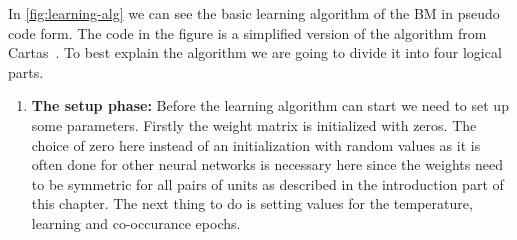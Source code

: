 \documentclass[12pt,twoside]{article}
\theoremstyle{plain}
\theoremstyle{definition}
\theoremstyle{remark}
\begin{document}
In \cref{fig:learning-alg} we can see the basic learning algorithm of the BM in pseudo code form.
The code in the figure is a simplified version of the algorithm from Cartas~\cite{BMImpl}.
To best explain the algorithm we are going to divide it into four logical parts.
\begin{enumerate}
    \item \textbf{The setup phase:}\newline
        Before the learning algorithm can start we need to set up some parameters. Firstly the weight matrix is initialized with zeros.
        The choice of zero here instead of an initialization with random values as it is often done for other neural networks is
        necessary here since the weights need to be symmetric for all pairs of units as described in the introduction part of this chapter.
        The next thing to do is setting values for the temperature, learning and co-occurance epochs. 
        

\end{enumerate}
\end{document}
